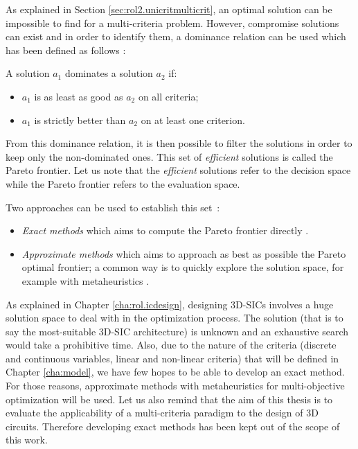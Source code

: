 As explained in Section \ref{sec:rol2.unicritmulticrit}, an optimal solution can be impossible to find for a multi-criteria problem. However, compromise solutions can exist and in order to identify them, a dominance relation can be used which has been defined as follows \cite{BraMar2002}:

\begin{definition}[Dominance]
A solution $a_1$ dominates a solution $a_2$ if:
\begin{itemize}
\item $a_1$ is as least as good as $a_2$ on all criteria;
\item $a_1$ is strictly better than $a_2$ on at least one criterion.
\end{itemize}
\end{definition}

From this dominance relation, it is then possible to filter the solutions in order to keep only the non-dominated ones. This set of \emph{efficient} solutions is called the Pareto frontier. Let us note that the \emph{efficient} solutions refer to the decision space while the Pareto frontier refers to the evaluation space.

Two approaches can be used to establish this set~\cite{Vin92}:
\begin{itemize}
\item \textit{Exact methods} which aims to compute the Pareto frontier directly \cite{EhrgottGandibleuxbook02,steuer86a}.
\item \textit{Approximate methods} which aims to approach as best as possible the Pareto optimal frontier; a common way is to quickly explore the solution space, for example with metaheuristics \cite{talbi09}.
\end{itemize}
As explained in Chapter \ref{cha:rol.icdesign}, designing 3D-SICs involves a huge solution space to deal with in the optimization process. The solution (that is to say the most-suitable 3D-SIC architecture) is unknown and an exhaustive search would take a prohibitive time. Also, due to the nature of the criteria (discrete and continuous variables, linear and non-linear criteria) that will be defined in Chapter \ref{cha:model}, we have few hopes to be able to develop an exact method. For those reasons, approximate methods with metaheuristics for multi-objective optimization will be used. Let us also remind that the aim of this thesis is to evaluate the applicability of a multi-criteria paradigm to the design of 3D circuits. Therefore developing exact methods has been kept out of the scope of this work.

